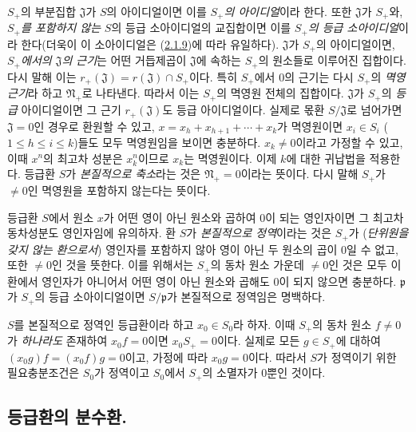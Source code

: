 \begin{env}[2.1.10]
\label{II.2.1.10-ko}
$S_+$의 부분집합 $\mathfrak{J}$가 $S$의 아이디얼이면 이를
\emph{$S_+$의 아이디얼}이라 한다. 또한 $\mathfrak{J}$가 $S_+$와,
\emph{$S_+$를 포함하지 않는} $S$의 등급 소아이디얼의 교집합이면 이를
\emph{$S_+$의 등급 소아이디얼}이라 한다(더욱이 이 소아이디얼은
(\hyperref[II.2.1.9-ko]{2.1.9})에 따라 유일하다). $\mathfrak{J}$가
$S_+$의 아이디얼이면, \emph{$S_+$에서의 $\mathfrak{J}$의 근기}는 어떤
거듭제곱이 $\mathfrak{J}$에 속하는 $S_+$의 원소들로 이루어진 집합이다.
다시 말해 이는 $r_+(\mathfrak{J})=r(\mathfrak{J})\cap S_+$이다. 특히
$S_+$에서 $0$의 근기는 다시 $S_+$의 \emph{멱영근기}라 하고
$\mathfrak{N}_+$로 나타낸다. 따라서 이는 $S_+$의 멱영원 전체의
집합이다. $\mathfrak{J}$가 $S_+$의 \emph{등급} 아이디얼이면 그 근기
$r_+(\mathfrak{J})$도 등급 아이디얼이다. 실제로 몫환
$S/\mathfrak{J}$로 넘어가면 $\mathfrak{J}=0$인 경우로 환원할 수 있고,
$x=x_h+x_{h+1}+\cdots+x_k$가 멱영원이면
$x_i\in S_i$ ($1\leq h\leq i\leq k$)들도 모두 멱영원임을 보이면
충분하다. $x_k\neq 0$이라고 가정할 수 있고, 이때 $x^n$의 최고차
성분은 $x_k^n$이므로 $x_k$는 멱영원이다. 이제 $k$에 대한 귀납법을
적용한다. 등급환 $S$가 \emph{본질적으로 축소}라는 것은
$\mathfrak{N}_+=0$이라는 뜻이다. 다시 말해 $S_+$가 $\neq 0$인 멱영원을
포함하지 않는다는 뜻이다.
\end{env}

\begin{env}[2.1.11]
\label{II.2.1.11-ko}
등급환 $S$에서 원소 $x$가 어떤 영이 아닌 원소와 곱하여 $0$이 되는
영인자이면 그 최고차 동차성분도 영인자임에 유의하자. 환 $S$가
\emph{본질적으로 정역}이라는 것은 $S_+$가
(\emph{단위원을 갖지 않는 환으로서}) 영인자를 포함하지 않아 영이 아닌
두 원소의 곱이 $0$일 수 없고, 또한 $\neq 0$인 것을 뜻한다. 이를 위해서는
$S_+$의 동차 원소 가운데 $\neq 0$인 것은 모두 이 환에서 영인자가 아니어서
어떤 영이 아닌 원소와 곱해도 $0$이 되지 않으면 충분하다.
$\mathfrak{p}$가 $S_+$의
등급 소아이디얼이면 $S/\mathfrak{p}$가 본질적으로 정역임은 명백하다.

$S$를 본질적으로 정역인 등급환이라 하고 $x_0\in S_0$라 하자. 이때
$S_+$의 동차 원소 $f\neq 0$가 \emph{하나라도} 존재하여
$x_0f=0$이면 $x_0S_+=0$이다. 실제로 모든 $g\in S_+$에
대하여 $(x_0g)f=(x_0f)g=0$이고, 가정에 따라 $x_0g=0$이다. 따라서
$S$가 정역이기 위한 필요충분조건은 $S_0$가 정역이고 $S_0$에서
$S_+$의 소멸자가 $0$뿐인 것이다.
\end{env}

\subsection{등급환의 분수환.}
\label{subsection:II.2.2-ko}

